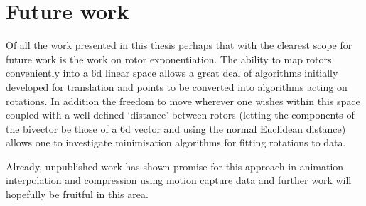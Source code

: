 \section{Future work}

Of all the work presented in this thesis perhaps that with the clearest scope for
future work is the work on rotor exponentiation. The ability to map rotors conveniently
into a 6d linear space allows a great deal of algorithms initially developed for
translation and points to be converted into algorithms acting on rotations. In addition
the freedom to move wherever one wishes within this space coupled with a well defined 
`distance' between rotors (letting the components of the bivector be those of a 6d vector and
using the normal Euclidean distance) allows one to investigate minimisation algorithms for
fitting rotations to data.

Already, unpublished work has shown promise for this approach in animation interpolation
and compression using motion capture data and further work will hopefully be fruitful in this
area.
